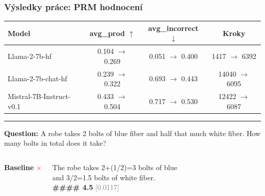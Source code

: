 \begin{frame}
\frametitle{Výsledky práce: PRM hodnocení}

\vspace{-0.4cm}

\begin{table}
\centering
\small
\renewcommand{\arraystretch}{1.25}
\begin{tabular}{lccc}
\toprule
\textbf{Model} &
\textbf{avg\_prod} $\uparrow$ &
\textbf{avg\_incorrect} $\downarrow$ &
\textbf{Kroky} \\
\midrule

Llama-2-7b-hf &
0.104 $\to$ \textcolor{green!60!black}{0.269} &
0.051 $\to$ 0.400 &
1417 $\to$  6392 \\

Llama-2-7b-chat-hf &
0.239 $\to$ \textcolor{green!60!black}{0.322} &
0.693 $\to$ \textcolor{green!60!black}{0.443} &
14040 $\to$ 6095 \\

Mistral-7B-Instruct-v0.1 &
0.433 $\to$ \textcolor{green!60!black}{0.504} &
0.717 $\to$ \textcolor{green!60!black}{0.530} &
12422 $\to$ 6087 \\

\bottomrule
\end{tabular}
\end{table}

\vspace{0.15cm}
\hrule
\vspace{0.25cm}

\small
\textbf{Question:}
A robe takes 2 bolts of blue fiber and half that much white fiber.
How many bolts in total does it take?

\vspace{0.35cm}

\begin{columns}[T]


\textbf{Baseline}
\textcolor{red}{$\times$}

\vspace{0.15cm}

{\footnotesize\ttfamily
The robe takes 2+(1/2)=3 bolts of blue\\
and 3/2=1.5 bolts of white fiber.\\[0.2cm]
\textbf{\#\#\#\# 4.5}
\textcolor{gray}{[0.0117]}
}


\centering
\vspace{0.1cm}
\rule{0.4pt}{3.0cm}


\end{columns}
\end{frame}
